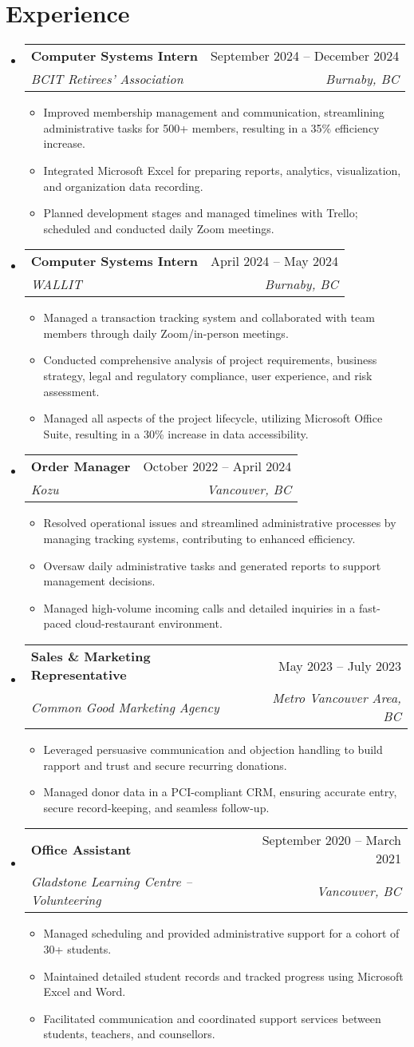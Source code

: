 \documentclass[letterpaper,11pt]{article}
\makeatletter
\newcommand{\resumeItem}[1]{
\item\small{
{#1 \vspace{-2pt}}
}
}
\newcommand{\resumeSubheading}[4]{
\vspace{-2pt}\item
\begin{tabular*}{0.97\textwidth}[t]{l@{\extracolsep{\fill}}r}
\textbf{#1} & #2 \\
\textit{\small#3} & \textit{\small #4} \\
\end{tabular*}\vspace{-7pt}
}
\newcommand{\resumeSubHeadingListStart}{\begin{itemize}[leftmargin=0.15in, label={}]}
\newcommand{\resumeSubHeadingListEnd}{\end{itemize}}
\newcommand{\resumeItemListStart}{\begin{itemize}}
\newcommand{\resumeItemListEnd}{\end{itemize}\vspace{-5pt}}
\makeatother
\begin{document}
\section{Experience}
\resumeSubHeadingListStart
\resumeSubheading{Computer Systems Intern}{September 2024 – December 2024}{BCIT Retirees' Association}{Burnaby, BC}
\resumeItemListStart
\resumeItem{Improved membership management and communication, streamlining administrative tasks for 500+ members, resulting in a 35\% efficiency increase.}
\resumeItem{Integrated Microsoft Excel for preparing reports, analytics, visualization, and organization data recording.}
\resumeItem{Planned development stages and managed timelines with Trello; scheduled and conducted daily Zoom meetings.}
\resumeItemListEnd
\resumeSubheading{Computer Systems Intern}{April 2024 – May 2024}{WALLIT}{Burnaby, BC}
\resumeItemListStart
\resumeItem{Managed a transaction tracking system and collaborated with team members through daily Zoom/in-person meetings.}
\resumeItem{Conducted comprehensive analysis of project requirements, business strategy, legal and regulatory compliance, user experience, and risk assessment.}
\resumeItem{Managed all aspects of the project lifecycle, utilizing Microsoft Office Suite, resulting in a 30\% increase in data accessibility.}
\resumeItemListEnd
\resumeSubheading{Order Manager}{October 2022 – April 2024}{Kozu}{Vancouver, BC}
\resumeItemListStart
\resumeItem{Resolved operational issues and streamlined administrative processes by managing tracking systems, contributing to enhanced efficiency.}
\resumeItem{Oversaw daily administrative tasks and generated reports to support management decisions.}
\resumeItem{Managed high-volume incoming calls and detailed inquiries in a fast-paced cloud-restaurant environment.}
\resumeItemListEnd
\resumeSubheading{Sales \& Marketing Representative}{May 2023 – July 2023}{Common Good Marketing Agency}{Metro Vancouver Area, BC}
\resumeItemListStart
\resumeItem{Leveraged persuasive communication and objection handling to build rapport and trust and secure recurring donations.}
\resumeItem{Managed donor data in a PCI-compliant CRM, ensuring accurate entry, secure record-keeping, and seamless follow-up.}
\resumeItemListEnd
\resumeSubheading{Office Assistant}{September 2020 – March 2021}{Gladstone Learning Centre – Volunteering}{Vancouver, BC}
\resumeItemListStart
\resumeItem{Managed scheduling and provided administrative support for a cohort of 30+ students.}
\resumeItem{Maintained detailed student records and tracked progress using Microsoft Excel and Word.}
\resumeItem{Facilitated communication and coordinated support services between students, teachers, and counsellors.}
\resumeItemListEnd
\resumeSubHeadingListEnd
\end{document}
